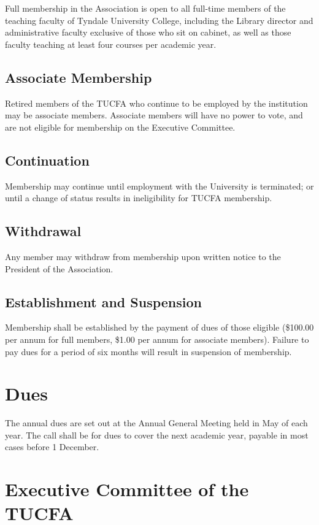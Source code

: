\documentclass[12pt]{article}
\begin{document}
Full membership in the Association is open to all full-time members of the teaching faculty of Tyndale University College, including the Library director and administrative faculty exclusive of those who sit on cabinet, as well as those faculty teaching at least four courses per academic year.

\subsection{Associate Membership}
Retired members of the TUCFA who continue to be employed by the institution may be associate members. Associate members will have no power to vote, and are not eligible for membership on the Executive Committee.

\subsection{Continuation}
Membership may continue until employment with the University is terminated; or until a change of status results in ineligibility for TUCFA membership.

\subsection{Withdrawal}
Any member may withdraw from membership upon written notice to the President of the Association.

\subsection{Establishment and Suspension}

Membership shall be established by the payment of dues of those eligible (\$100.00 per annum for full members, \$1.00 per annum for associate members). Failure to pay dues for a period of six months will result in suspension of membership.

\section{Dues}

The annual dues are set out at the Annual General Meeting held in May of each year. The call shall be for dues to cover the next academic year, payable in most cases before 1 December.

\section{Executive Committee of the TUCFA}
\end{document}
